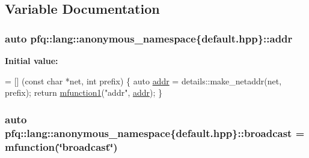 \subsection{Variable Documentation}
\hypertarget{namespacepfq_1_1lang_1_1anonymous__namespace_02default_8hpp_03_a13cabe468839119d8d68540e3c60718b}{
\subsubsection[{addr}]{\setlength{\rightskip}{0pt plus 5cm}auto pfq\+::lang\+::anonymous\+\_\+namespace\{default.\+hpp\}\+::addr}}\label{namespacepfq_1_1lang_1_1anonymous__namespace_02default_8hpp_03_a13cabe468839119d8d68540e3c60718b}
{\bfseries Initial value\+:}
\begin{DoxyCode}
= [] (\textcolor{keyword}{const} \textcolor{keywordtype}{char} *net, \textcolor{keywordtype}{int} prefix)
        \{
            \textcolor{keyword}{auto} \hyperlink{namespacepfq_1_1lang_1_1anonymous__namespace_02default_8hpp_03_a13cabe468839119d8d68540e3c60718b}{addr} = details::make\_netaddr(net, prefix);
            \textcolor{keywordflow}{return} \hyperlink{namespacepfq_1_1lang_a68d775c68562fbd0ab9ef213f2519499}{mfunction1}(\textcolor{stringliteral}{"addr"}, \hyperlink{namespacepfq_1_1lang_1_1anonymous__namespace_02default_8hpp_03_a13cabe468839119d8d68540e3c60718b}{addr});
        \}
\end{DoxyCode}
\hypertarget{namespacepfq_1_1lang_1_1anonymous__namespace_02default_8hpp_03_ac9e0f3ad7fa32146565f4aaab709d19d}{
\subsubsection[{broadcast}]{\setlength{\rightskip}{0pt plus 5cm}auto pfq\+::lang\+::anonymous\+\_\+namespace\{default.\+hpp\}\+::broadcast = {\bf mfunction}(\char`\"{}broadcast\char`\"{})}}\label{namespacepfq_1_1lang_1_1anonymous__namespace_02default_8hpp_03_ac9e0f3ad7fa32146565f4aaab709d19d}
